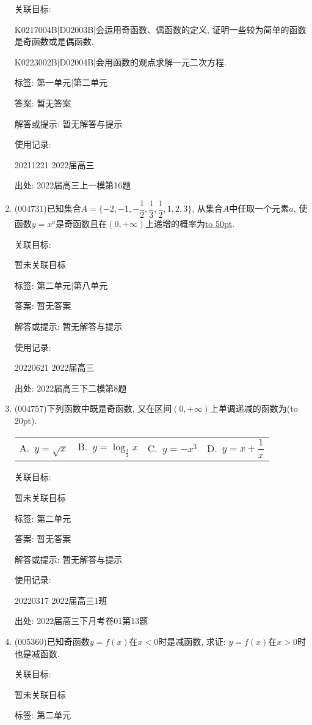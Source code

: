 \documentclass[10pt,a4paper]{article}
\newcommand{\blank}[1]{\underline{\hbox to #1pt{}}}
\newcommand{\bracket}[1]{(\hbox to #1pt{})}
\newcommand{\fourch}[4]{\par\begin{tabular}{p{.23\textwidth}p{.23\textwidth}p{.23\textwidth}p{.23\textwidth}}
A.~#1 &B.~#2& C.~#3& D.~#4
\end{tabular}}
\begin{document}
\begin{enumerate}[1.]
关联目标:

K0217004B|D02003B|会运用奇函数、偶函数的定义, 证明一些较为简单的函数是奇函数或是偶函数.

K0223002B|D02004B|会用函数的观点求解一元二次方程.



标签: 第一单元|第二单元

答案: 暂无答案

解答或提示: 暂无解答与提示

使用记录:

20211221	2022届高三	


出处: 2022届高三上一模第16题
\item { (004731)}已知集合$A=\{-2,-1,-\dfrac 12,\dfrac 13,\dfrac 12,1,2,3\}$, 从集合$A$中任取一个元素$a$, 使函数$y=x^a$是奇函数且在$(0,+\infty)$上递增的概率为\blank{50}.


关联目标:

暂未关联目标



标签: 第二单元|第八单元

答案: 暂无答案

解答或提示: 暂无解答与提示

使用记录:

20220621	2022届高三	


出处: 2022届高三下二模第8题
\item { (004757)}下列函数中既是奇函数, 又在区间$(0,+\infty)$上单调递减的函数为\bracket{20}.
\fourch{$y=\sqrt x$}{$y=\log_{\frac 12}x$}{$y=-x^3$}{$y=x+\dfrac 1x$}


关联目标:

暂未关联目标



标签: 第二单元

答案: 暂无答案

解答或提示: 暂无解答与提示

使用记录:

20220317	2022届高三1班	


出处: 2022届高三下月考卷01第13题
\item { (005360)}已知奇函数$y=f(x)$在$x<0$时是减函数, 求证: $y=f(x)$在$x>0$时也是减函数.


关联目标:

暂未关联目标



标签: 第二单元


\end{enumerate}
\end{document}
